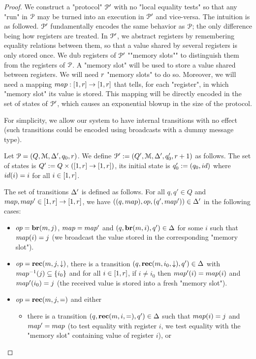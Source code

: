 \begin{proof}
	We construct a "protocol" $\mathcal{P}'$ with no "local equality tests" so that any "run" in $\mathcal{P}$ may be turned into an execution in $\mathcal{P}'$ and vice-versa. 
	The intuition is as followed. $\mathcal{P}'$ fundamentally encodes the same behavior as $\mathcal{P}$; the only difference being how registers are treated. In $\mathcal{P}'$, we abstract registers by remembering equality relations between them, so that a value shared by several registers is only stored once. We dub registers of $\mathcal{P}'$ ""memory slots"" to distinguish them from the registers of $\mathcal{P}$. A "memory slot" will be used to store a value shared between registers. 
	We will need $r$ "memory slots" to do so. Moreover, we will need a mapping $\map : \nset{1}{r} \to \nset{1}{r}$ that tells, for each "register", in which "memory slot" its value is stored. This mapping will be directly encoded in the set of states of $\mathcal{P}'$, which causes an exponential blowup in the size of the protocol.
	
	For simplicity, we allow our system to have internal transitions with no effect (such transitions could be encoded using broadcasts with a dummy message type). 
	
	Let $\mathcal{P} = (Q, \mathcal{M}, \Delta', q_0, r)$. 
	We define $\mathcal{P}' := (Q', \mathcal{M}, \Delta', q_0', r +1)$ as follows. The set of states is $Q' := Q \times ([1,r] \to [1,r])$, its initial state is $q_0' := (q_0, \idmap)$ where $\idmap(i) = i$ for all $i \in [1,r]$. 
	
	The set of transitions $\Delta'$ is defined as follows.
	For all $q,q' \in Q$ and $\map, \map' \in \nset{1}{r} \to \nset{1}{r}$, we have $((q, \map), \op, (q', \map')) \in \transitions'$ in the following cases:
	
	\begin{itemize}
		\item $\op = \br{m}{j}$, 
		$\map = \map'$ and $(q, \textbf{br}(m, i), q') \in \Delta$ for some $i$ such that $\map(i) = j$ (we broadcast the value stored in the corresponding "memory slot").
		
		\item $\op=\rec{m}{j}{\enregact}$, there is a transition $(q, \textbf{rec}(m, i_0, \downarrow), q') \in \Delta$ with $\map^{-1}(j) \subseteq \set{i_0}$ and for all $i \in [1,r]$, if $i \ne i_0$ then $\map'(i) = \map(i)$ and $\map'(i_0) = j$ (the received value is stored into a fresh "memory slot").
		
		\item $\op = \rec{m}{j}{\eqtestact}$ and either
		\begin{itemize}
			\item there is a transition $(q, \textbf{rec}(m, i, {=}), q') \in \Delta$ such that $\map(i)=j$ and $\map'=\map$ (to test equality with register $i$, we test equality with the "memory slot" containing value of register $i$), or
			

\end{itemize}
\end{itemize}
\end{proof}
